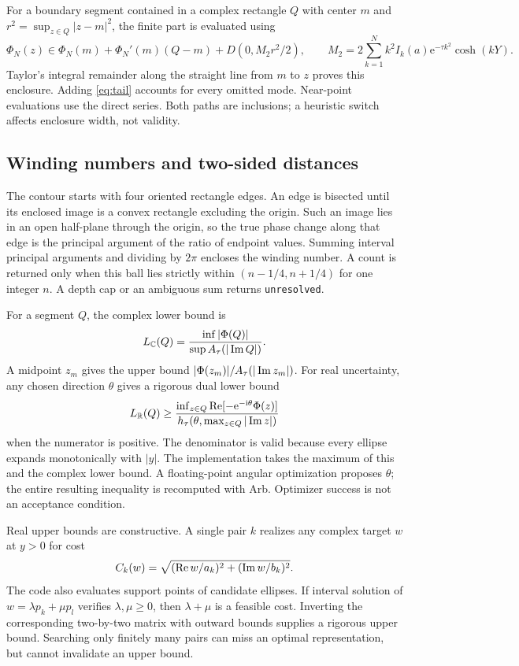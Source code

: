 \documentclass[11pt]{article}
\newcommand{\C}{\mathbb C}\newcommand{\R}{\mathbb R}\newcommand{\Z}{\mathbb Z}\newcommand{\e}{\mathrm e}\newcommand{\ii}{\mathrm i}\newcommand{\dd}{\,\mathrm d}
\begin{document}
For a boundary segment contained in a complex rectangle $Q$ with center $m$ and $r^2=\sup_{z\in Q}|z-m|^2$, the finite part is evaluated using
\begin{equation}\label{eq:taylor}
 \Phi_N(z)\in\Phi_N(m)+\Phi_N'(m)(Q-m)+D(0,M_2r^2/2),\qquad
 M_2=2\sum_{k=1}^N k^2I_k(a)\e^{-\tau k^2}\cosh(kY).
\end{equation}
Taylor's integral remainder along the straight line from $m$ to $z$ proves this enclosure. Adding \eqref{eq:tail} accounts for every omitted mode. Near-point evaluations use the direct series. Both paths are inclusions; a heuristic switch affects enclosure width, not validity.

\subsection{Winding numbers and two-sided distances}
The contour starts with four oriented rectangle edges. An edge is bisected until its enclosed image is a convex rectangle excluding the origin. Such an image lies in an open half-plane through the origin, so the true phase change along that edge is the principal argument of the ratio of endpoint values. Summing interval principal arguments and dividing by $2\pi$ encloses the winding number. A count is returned only when this ball lies strictly within $(n-1/4,n+1/4)$ for one integer $n$. A depth cap or an ambiguous sum returns \texttt{unresolved}.

For a segment $Q$, the complex lower bound is
\begin{equation}
 L_\C(Q)=\frac{\inf|\Phi(Q)|}{\sup A_\tau(|\Ima Q|)}.
\end{equation}
A midpoint $z_m$ gives the upper bound $|\Phi(z_m)|/A_\tau(|\operatorname{Im} z_m|)$. For real uncertainty, any chosen direction $\theta$ gives a rigorous dual lower bound
\begin{equation}\label{eq:dualbound}
 L_\R(Q)\ge
 \frac{\inf_{z\in Q}\Rea[-\e^{-\ii\theta}\Phi(z)]}
 {h_\tau(\theta,\max_{z\in Q}|\Ima z|)}
\end{equation}
when the numerator is positive. The denominator is valid because every ellipse expands monotonically with $|y|$. The implementation takes the maximum of this and the complex lower bound. A floating-point angular optimization proposes $\theta$; the entire resulting inequality is recomputed with Arb. Optimizer success is not an acceptance condition.

Real upper bounds are constructive. A single pair $k$ realizes any complex target $w$ at $y>0$ for cost
\begin{equation}\label{eq:single}
 C_k(w)=\sqrt{(\operatorname{Re} w/a_k)^2+(\operatorname{Im} w/b_k)^2}.
\end{equation}
The code also evaluates support points of candidate ellipses. If interval solution of $w=\lambda p_k+\mu p_l$ verifies $\lambda,\mu\ge0$, then $\lambda+\mu$ is a feasible cost. Inverting the corresponding two-by-two matrix with outward bounds supplies a rigorous upper bound. Searching only finitely many pairs can miss an optimal representation, but cannot invalidate an upper bound.
\end{document}
